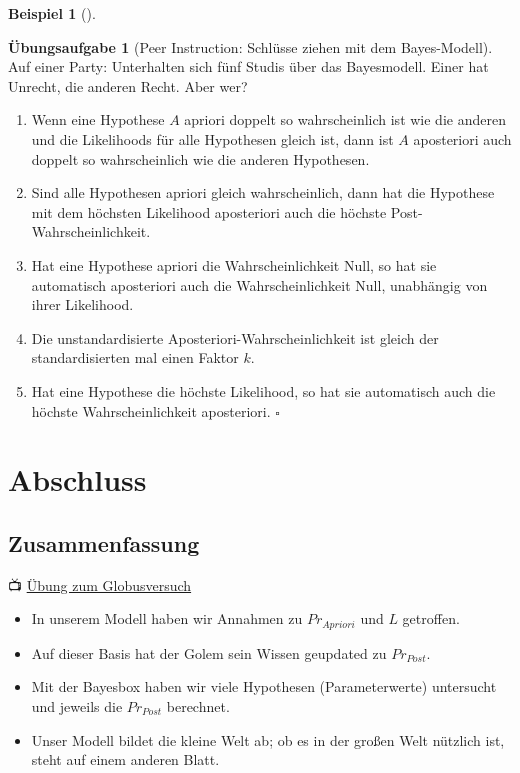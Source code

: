 \documentclass[
  ngerman,
  letterpaper,
  twoside,
  open=any]{scrbook}
\providecommand{\tightlist}{%
  \setlength{\itemsep}{0pt}\setlength{\parskip}{0pt}}\usepackage{longtable,booktabs,array}
\theoremstyle{definition}
\newtheorem{example}{Beispiel}[chapter]
\theoremstyle{plain}
\theoremstyle{definition}
\newtheorem{exercise}{Übungsaufgabe}[chapter]
\theoremstyle{definition}
\theoremstyle{remark}
\begin{document}
\begin{example}[]
\begin{exercise}[Peer Instruction: Schlüsse ziehen mit dem
Bayes-Modell]
Auf einer Party: Unterhalten sich fünf Studis über das Bayesmodell.
Einer hat Unrecht, die anderen Recht. Aber wer?

\begin{enumerate}
\def\labelenumi{\Alph{enumi})}
\item
  Wenn eine Hypothese \(A\) apriori doppelt so wahrscheinlich ist wie
  die anderen und die Likelihoods für alle Hypothesen gleich ist, dann
  ist \(A\) aposteriori auch doppelt so wahrscheinlich wie die anderen
  Hypothesen.
\item
  Sind alle Hypothesen apriori gleich wahrscheinlich, dann hat die
  Hypothese mit dem höchsten Likelihood aposteriori auch die höchste
  Post-Wahrscheinlichkeit.
\item
  Hat eine Hypothese apriori die Wahrscheinlichkeit Null, so hat sie
  automatisch aposteriori auch die Wahrscheinlichkeit Null, unabhängig
  von ihrer Likelihood.
\item
  Die unstandardisierte Aposteriori-Wahrscheinlichkeit ist gleich der
  standardisierten mal einen Faktor \(k\).
\item
  Hat eine Hypothese die höchste Likelihood, so hat sie automatisch auch
  die höchste Wahrscheinlichkeit aposteriori. \(\square\)
\end{enumerate}

\end{exercise}

\section{Abschluss}\label{abschluss}

\subsection{Zusammenfassung}\label{zusammenfassung}

📺
\href{https://www.youtube.com/watch?v=YJEZiQvCBgs&list=PLRR4REmBgpIGgz2Oe2Z9FcoLYBDnaWatN&index=7}{Übung
zum Globusversuch}

\begin{itemize}
\tightlist
\item
  In unserem Modell haben wir Annahmen zu \(Pr_{Apriori}\) und \(L\)
  getroffen.
\item
  Auf dieser Basis hat der Golem sein Wissen geupdated zu \(Pr_{Post}\).
\item
  Mit der Bayesbox haben wir viele Hypothesen (Parameterwerte)
  untersucht und jeweils die \(Pr_{Post}\) berechnet.
\item
  Unser Modell bildet die kleine Welt ab; ob es in der großen Welt
  nützlich ist, steht auf einem anderen Blatt.
\end{itemize}


\end{example}
\end{document}
